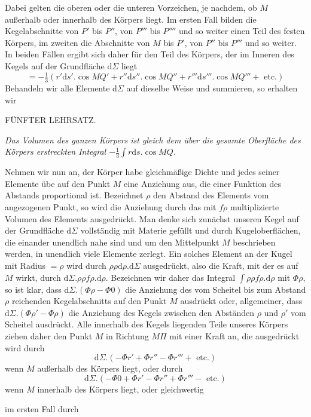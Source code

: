 Dabei gelten die oberen oder die unteren Vorzeichen, je nachdem, ob $M$ außerhalb oder innerhalb des Körpers liegt. Im ersten Fall bilden die Kegelabschnitte von $P'$ bis $P''$, von $P'''$ bis $P''''$ und so weiter einen Teil des festen Körpers, im zweiten die Abschnitte von $M$ bis $P'$, von $P''$ bis $P'''$ und so weiter. In beiden Fällen ergibt sich daher für den Teil des Körpers, der im Inneren des Kegels auf der Grundfläche $\mathrm{d}\Sigma$ liegt
\[
=-\tfrac13(r'\mathrm{d}s'.\cos MQ'+r''\mathrm{d}s''.\cos MQ''+r'''\mathrm{d}s'''.\cos MQ'''+\text{ etc.})
\]
Behandeln wir alle Elemente $\mathrm{d}\Sigma$ auf dieselbe Weise und summieren, so erhalten wir
\par\medskip{}
\begin{center}FÜNFTER LEHRSATZ.\end{center}
\par
\textit{Das Volumen des ganzen Körpers ist gleich dem über die gesamte Oberfläche des Körpers erstreckten Integral $-\tfrac13\int r\mathrm{d}s.\cos MQ$.}

\par
Nehmen wir nun an, der Körper habe gleichmäßige Dichte und jedes seiner Elemente übe auf den Punkt $M$ eine Anziehung aus, die einer Funktion des Abstands proportional ist. Bezeichnet $\rho$ den Abstand des Elements vom angezogenen Punkt, so wird die Anziehung durch das mit $f\rho$ multiplizierte Volumen des Elements ausgedrückt. Man denke sich zunächst unseren Kegel auf der Grundfläche $\mathrm{d}\Sigma$ vollständig mit Materie gefüllt und durch Kugeloberflächen, die einander unendlich nahe sind und um den Mittelpunkt $M$ beschrieben werden, in unendlich viele Elemente zerlegt. Ein solches Element an der Kugel mit Radius $=\rho$ wird durch $\rho\rho\mathrm{d}\rho.\mathrm{d}\Sigma$ ausgedrückt, also die Kraft, mit der es auf $M$ wirkt, durch $\mathrm{d}\Sigma.\rho\rho f\rho.\mathrm{d}\rho$. Bezeichnen wir daher das Integral $\int\rho\rho f\rho.\mathrm{d}\rho$ mit $\Phi\rho$, so ist klar, dass $\mathrm{d}\Sigma.(\Phi\rho-\Phi0)$ die Anziehung des vom Scheitel bis zum Abstand $\rho$ reichenden Kegelabschnitts auf den Punkt $M$ ausdrückt oder, allgemeiner, dass $\mathrm{d}\Sigma.(\Phi\rho'-\Phi\rho)$ die Anziehung des Kegels zwischen den Abständen $\rho$ und $\rho'$ vom Scheitel ausdrückt. Alle innerhalb des Kegels liegenden Teile unseres Körpers ziehen daher den Punkt $M$ in Richtung $M\Pi$ mit einer Kraft an, die ausgedrückt wird durch
\[
\mathrm{d}\Sigma.(-\Phi r'+\Phi r''-\Phi r'''+\text{ etc.})
\]
wenn $M$ außerhalb des Körpers liegt, oder durch
\[
\mathrm{d}\Sigma.(-\Phi0+\Phi r'-\Phi r''+\Phi r'''-\text{ etc.})
\]
wenn $M$ innerhalb des Körpers liegt, oder gleichwertig
\par
im ersten Fall durch
